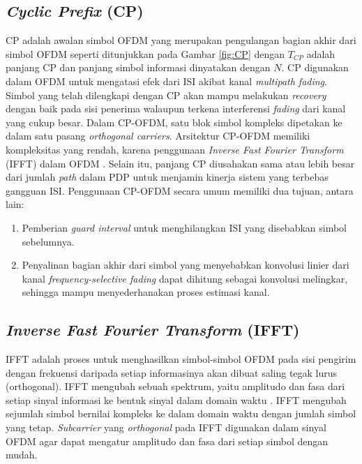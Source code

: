 \subsection{\textit{Cyclic Prefix} (CP)}
CP adalah awalan simbol OFDM yang merupakan pengulangan bagian akhir dari simbol OFDM seperti ditunjukkan pada Gambar \ref{fig:CP} dengan $T_{CP}$ adalah panjang CP dan panjang simbol informasi dinyatakan dengan $N$. CP digunakan dalam OFDM untuk mengatasi efek dari ISI akibat kanal \textit{multipath fading}. Simbol yang telah dilengkapi dengan CP akan mampu melakukan \textit{recovery} dengan baik pada sisi penerima walaupun terkena interferensi \textit{fading} dari kanal yang cukup besar. Dalam CP-OFDM, satu blok simbol kompleks dipetakan ke dalam satu pasang \textit{orthogonal carriers}. Arsitektur CP-OFDM memiliki kompleksitas yang rendah, karena penggunaan \textit{Inverse Fast Fourier Transform} (IFFT) dalam OFDM \cite{CP1}. Selain itu, panjang CP diusahakan sama atau lebih besar dari jumlah \textit{path} dalam PDP untuk menjamin kinerja sistem yang terbebas gangguan ISI. Penggunaan CP-OFDM secara umum memiliki dua tujuan, antara lain:
\begin{enumerate}
	\item Pemberian \textit{guard interval} untuk menghilangkan ISI yang disebabkan simbol sebelumnya.
	\item Penyalinan bagian akhir dari simbol yang menyebabkan konvolusi linier dari kanal \textit{frequency-selective fading} dapat dihitung sebagai konvolusi melingkar, sehingga mampu menyederhanakan proses estimasi kanal.
\end{enumerate}

\subsection{\textit{Inverse Fast Fourier Transform} (IFFT) }
IFFT adalah proses untuk menghasilkan simbol-simbol OFDM pada sisi pengirim dengan frekuensi daripada setiap informasinya akan dibuat saling tegak lurus (orthogonal). IFFT mengubah sebuah spektrum, yaitu amplitudo dan fasa dari setiap sinyal informasi ke bentuk sinyal dalam domain waktu \cite{fft}. IFFT mengubah sejumlah simbol bernilai kompleks ke dalam domain waktu dengan jumlah simbol yang tetap. \textit{Subcarrier} yang \textit{orthogonal} pada IFFT digunakan dalam sinyal OFDM agar dapat mengatur amplitudo dan fasa dari setiap simbol dengan mudah.

